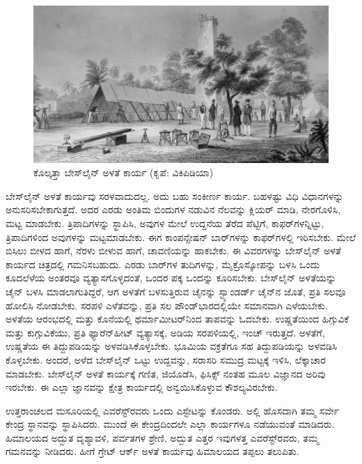 \begin{figure}[!hbtp]
\includegraphics{"images/image014.jpg"}
\caption{ಕೊಲ್ಕತ್ತಾ ಬೇಸ್‌ಲೈನ್​ ಅಳತೆ ಕಾರ್ಯ (ಕೃಪೆ: ವಿಕಿಪಿಡಿಯಾ)}\label{art11-fig2}
\end{figure}

\newpage

ಬೇಸ್‌ಲೈನ್​ ಅಳತೆ ಕಾರ್ಯವು ಸರಳವಾದುದಲ್ಲ. ಅದು ಬಹು ಸಂಕೀರ್ಣ ಕಾರ್ಯ. ಬಹಳಷ್ಟು ವಿಧಿ ವಿಧಾನಗಳನ್ನು ಅನುಸರಿಸಬೇಕಾಗುತ್ತದೆ. ಅದರ ಎರಡು ಅಂತಿಮ ಬಿಂದುಗಳ ನಡುವಿನ ನೆಲವನ್ನು ಕ್ಲಿಯರ್​ ಮಾಡಿ, ನೇರಗೊಳಿಸಿ, ಮಟ್ಟ ಮಾಡಬೇಕು. ತ್ರಿಪಾದಿಗಳನ್ನು ಸ್ಥಾಪಿಸಿ, ಅವುಗಳ ಮೇಲೆ ಉದ್ದನೆಯ ತೆರೆದ ಪೆಟ್ಟಿಗೆ, ಕಾಫರ್​ಗಳನ್ನಿಟ್ಟು, ತ್ರಿಪಾದಿಗಳಿಂದ ಅವುಗಳನ್ನು ಮಟ್ಟಮಾಡಬೇಕು. ಈಗ ಕಾಂಪನ್ಸೇಷನ್​ ಬಾರ್​ಗಳನ್ನು ಕಾಫರ್​ಗಳಲ್ಲಿ ಇರಿಸಬೇಕು. ಮೇಲೆ ಬಿಸಿಲು ಬೀಳದ ಹಾಗೆ, ನೆರಳು ಬೀಳುವ ಹಾಗೆ, ಚಾವಣಿಯನ್ನು ಹಾಕಬೇಕು. ಈ ವಿವರಗಳನ್ನು ಬೇಸ್‌ಲೈನ್​ ಅಳತೆ ಕಾರ್ಯದ ಚಿತ್ರದಲ್ಲಿ ಗಮನಿಸಬಹುದು. ಎರಡು ಬಾರ್​ಗಳ ತುದಿಗಳನ್ನು, ಮೈಕ್ರೊಸ್ಕೋಪನ್ನು ಬಳಸಿ ಒಂದು ಕೂದಲೆಳೆಯ ಅಂತರವೂ ವ್ಯತ್ಯಾಸಗೊಳ್ಳದಂತೆ, ಒಂದರ ಪಕ್ಕ ಒಂದನ್ನು ಕೂರಿಸಬೇಕು. ಬೇಸ್‌ಲೈನ್​ ಅಳತೆಯನ್ನು ಚೈನ್​ ಬಳಸಿ ಮಾಡಲಾಗುತಿದ್ದರೆ, ಆಗ ಅಳತೆಗೆ ಬಳಸುತ್ತಿರುವ ಚೈನನ್ನು ಸ್ಟ್ಯಾಂಡರ್ಡ್ ಚೈನ್​ನ ಜೊತೆ, ಪ್ರತಿ ಸಲವೂ ಹೋಲಿಸಿ ನೋಡಬೇಕು. ಸರಪಳಿ ಎಳೆತವನ್ನು, ಪ್ರತಿ ಸಲ  ಪೌಂಡ್​ ಭಾರದಲ್ಲಿಯೇ ಸಮಾನವಾಗಿ ಎಳೆಯಬೇಕು. ಅಳತೆಯ ಆರಂಭದಲ್ಲಿ ಮತ್ತು ಕೊನೆಯಲ್ಲಿ ಥರ್ಮಾಮೀಟರ್​ನಿಂದ ತಾಪವನ್ನು ಓದಬೇಕು. ಉಷ್ಣತೆಯಿಂದ ಹಿಗ್ಗುವಿಕೆ ಮತ್ತು ಕುಗ್ಗುವಿಕೆಯು, ಪ್ರತಿ ಫ್ಯಾರೆನ್​ಹೀಟ್​ ವ್ಯತ್ಯಾಸಕ್ಕೆ,  ಅಡಿಯ ಸರಪಳಿಯಲ್ಲಿ,  ಇಂಚ್​ ಇರುತ್ತದೆ. ಅಳತೆಗೆ, ಉಷ್ಣತೆಯ ಈ ತಿದ್ದುಪಡಿಯನ್ನು ಅಳವಡಿಸಿಕೊಳ್ಳಬೇಕು. ಭೂಮಿಯ ವಕ್ರತೆಗೂ ಸಹ ತಿದ್ದುಪಡಿಯನ್ನು ಅಳವಡಿಸಿ ಕೊಳ್ಳಬೇಕು. ಅಂದರೆ, ಅಳೆದ ಬೇಸ್‌ಲೈನ್​ ಒಟ್ಟು ಉದ್ದವನ್ನು, ಸರಾಸರಿ ಸಮುದ್ರ ಮಟ್ಟಕ್ಕೆ ಇಳಿಸಿ, ಲೆಕ್ಕಾಚಾರ ಮಾಡಬೇಕು. ಬೇಸ್‌ಲೈನ್​ ಅಳತೆ ಕಾರ್ಯಕ್ಕೆ ಗಣಿತ, ಜಿಯೊಡೆಸಿ, ಫಿಸಿಕ್ಸ್​ ನಂತಹ ಮೂಲ ವಿಜ್ಞಾನದ ಅರಿವು ಇರಬೇಕು. ಈ ಎಲ್ಲಾ ಜ್ಞಾನವನ್ನು ಕ್ಷೇತ್ರ ಕಾರ್ಯದಲ್ಲಿ ಅನ್ವಯಿಸಿಕೊಳ್ಳುವ ಕೌಶಲ್ಯವಿರಬೇಕು.

ಉತ್ತರಾಂಚಲದ ಮಸೂರಿಯಲ್ಲಿ ಎವರೆಸ್ಟ್​ರವರು ಒಂದು ಎಸ್ಟೇಟನ್ನು ಕೊಂಡರು. ಅಲ್ಲಿ ಹೊಸದಾಗಿ ತಮ್ಮ ಸರ್ವೇ ಕೇಂದ್ರ ಸ್ಥಾನವನ್ನು ಸ್ಥಾಪಿಸಿದರು. ಮುಂದೆ ಈ ಕೇಂದ್ರದಿಂದಲೇ ಎಲ್ಲಾ ಕಾರ್ಯಗಳೂ ನಡೆಯುವಂತೆ ಮಾಡಿದರು. ಹಿಮಾಲಯದ ಅದ್ಭುತ ದೃಶ್ಯಾವಳಿ, ಪರ್ವತಗಳ ಶ್ರೇಣಿ, ಅದ್ಬುತ ಎತ್ತರ ಇವುಗಳತ್ತ ಎವರೆಸ್ಟ್​ರವರು, ತಮ್ಮ ಗಮನವನ್ನು ನೀಡಿದರು. ಹೀಗೆ ಗ್ರೇಟ್​ ಆರ್ಕ್ ಅಳತೆ ಕಾರ್ಯವು ಹಿಮಾಲಯದ ತಪ್ಪಲು ತಲುಪಿತು.

